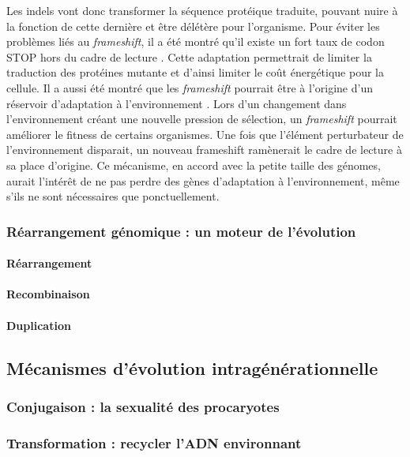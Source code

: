 Les indels vont donc transformer la séquence protéique traduite, pouvant nuire à la fonction de cette dernière et être délétère pour l'organisme. Pour éviter les problèmes liés au \textit{frameshift}, il a été montré qu'il existe un fort taux de codon STOP hors du cadre de lecture \cite{tse_natural_2010}. Cette adaptation permettrait de limiter la traduction des protéines mutante et d'ainsi limiter le coût énergétique pour la cellule. Il a aussi été montré que les \textit{frameshift} pourrait être à l'origine d'un réservoir d'adaptation à l'environnement \cite{koch_catastrophe_2004}. Lors d'un changement dans l'environnement créant une nouvelle pression de sélection, un \textit{frameshift} pourrait améliorer le fitness de certains organismes. Une fois que l'élément perturbateur de l'environnement disparait, un nouveau frameshift ramènerait le cadre de lecture à sa place d'origine. Ce mécanisme, en accord avec la petite taille des génomes, aurait l'intérêt de ne pas perdre des gènes d'adaptation à l'environnement, même s'ils ne sont nécessaires que ponctuellement.

\subsubsection{Réarrangement génomique : un moteur de l'évolution}
\paragraph{Réarrangement}
\paragraph{Recombinaison}
\paragraph{Duplication}

\subsection{Mécanismes d'évolution intragénérationnelle}
\label{sec:evo_hz}

\subsubsection{Conjugaison : la sexualité des procaryotes}

\subsubsection{Transformation : recycler l'ADN environnant}

